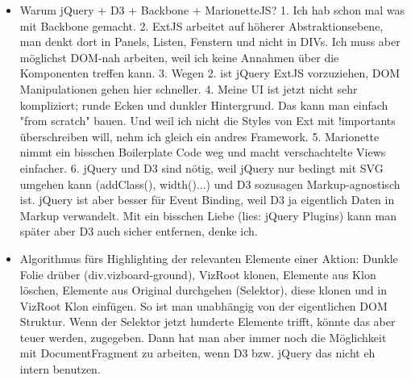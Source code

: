 \documentclass[
	headsepline,
	footsepline,
	fontsize=12pt,
	bibliography=totoc
]{scrbook}
\begin{document}
\begin{itemize}
	\item Warum jQuery + D3 + Backbone + MarionetteJS? 1. Ich hab schon mal was mit Backbone gemacht. 2. ExtJS arbeitet auf höherer Abstraktionsebene, man denkt dort in Panels, Listen, Fenstern und nicht in DIVs. Ich muss aber möglichst DOM-nah arbeiten, weil ich keine Annahmen über die Komponenten treffen kann. 3. Wegen 2. ist jQuery ExtJS vorzuziehen, DOM Manipulationen gehen hier schneller. 4. Meine UI ist jetzt nicht sehr kompliziert; runde Ecken und dunkler Hintergrund. Das kann man einfach "from scratch" bauen. Und weil ich nicht die Styles von Ext mit !importants überschreiben will, nehm ich gleich ein andres Framework. 5. Marionette nimmt ein bisschen Boilerplate Code weg und macht verschachtelte Views einfacher. 6. jQuery und D3 sind nötig, weil jQuery nur bedingt mit SVG umgehen kann (addClass(), width()...) und D3 sozusagen Markup-agnostisch ist. jQuery ist aber besser für Event Binding, weil D3 ja eigentlich Daten in Markup verwandelt. Mit ein bisschen Liebe (lies: jQuery Plugins) kann man später aber D3 auch sicher entfernen, denke ich.
	\item Algorithmus fürs Highlighting der relevanten Elemente einer Aktion: Dunkle Folie drüber (div.vizboard-ground), VizRoot klonen, Elemente aus Klon löschen, Elemente aus Original durchgehen (Selektor), diese klonen und in VizRoot Klon einfügen. So ist man unabhängig von der eigentlichen DOM Struktur. Wenn der Selektor jetzt hunderte Elemente trifft, könnte das aber teuer werden, zugegeben. Dann hat man aber immer noch die Möglichkeit mit DocumentFragment zu arbeiten, wenn D3 bzw. jQuery das nicht eh intern benutzen.
	
\end{itemize}

\printbibliography[title=Literaturverzeichnis]

\end{document}
